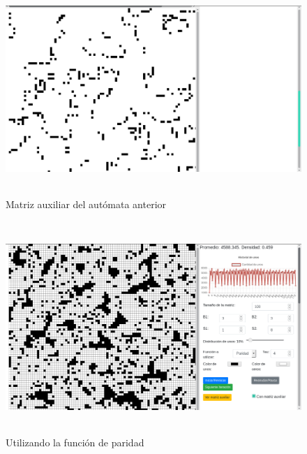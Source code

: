 \documentclass[12pt, titlepage]{article}
\begin{document}
\begin{figure}[H]
\begin{center}
 \includegraphics[width=15cm, height=8cm]{./img/3318-max-aux.png}
 \caption{Matriz auxiliar del autómata anterior}
 \label{fig:3318-max-aux}
\end{center}
\end{figure}

\begin{figure}[H]
\begin{center}
 \includegraphics[width=15cm, height=8cm]{./img/3318-paridad.png}
 \caption{Utilizando la función de paridad}
 \label{fig:3318-paridad}
\end{center}
\end{figure}
\end{document}
